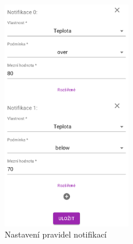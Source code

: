 \begin{figure}[htbp]
    \centering
    \includegraphics[width=0.5\textwidth]{img/notification_edit.png}
    \caption{Nastavení pravidel notifikací}
\end{figure}